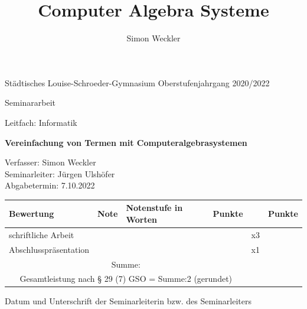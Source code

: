 \documentclass[11pt]{article}
\title{Computer Algebra Systeme}
\author{Simon Weckler}
\begin{document}
Städtisches Louise-Schroeder-Gymnasium
\hfill
Oberstufenjahrgang 2020/2022

\vspace{65pt}

\begin{center}
  {\huge Seminararbeit}
\end{center}

\vspace{35pt}

{\huge Leitfach: Informatik}

\vspace{85pt}

\begin{center}
  {\Huge \textbf{Vereinfachung von Termen mit Computeralgebrasystemen}}
\end{center}

\vspace{85pt}

Verfasser: Simon Weckler \\
Seminarleiter: Jürgen Ulshöfer \\
Abgabetermin: 7.10.2022 \\

\vspace{35pt}

\begin{center}
\begin{tabular}{|l|l|l|l|l|l|}
  \hline
  Bewertung             & Note  & Notenstufe in Worten  & Punkte  &     & Punkte  \\ \hline
  schriftliche Arbeit   &       &                       &         & x3  &         \\ \hline
  Abschlusspräsentation &       &                       &         & x1  &         \\ \hline
  \multicolumn{4}{c}{Summe: } & & \\ \cline{6-6}
  \multicolumn{4}{c}{Gesamtleistung nach § 29 (7) GSO = Summe:2 (gerundet)} & & \\  \cline{6-6}
\end{tabular}
\end{center}

\vspace{35pt}

\hrulefill

Datum und Unterschrift der Seminarleiterin bzw. des Seminarleiters

\newpage

\tableofcontents

\newpage
\end{document}
